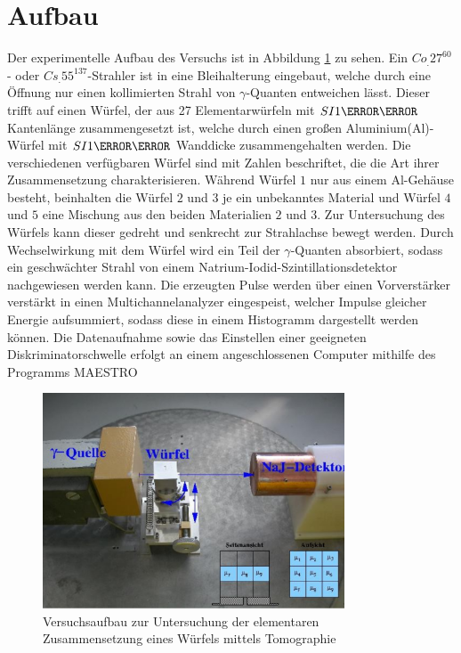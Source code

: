 \section{Aufbau}
\label{sec:Aufbau}

Der experimentelle Aufbau des Versuchs ist in Abbildung \ref{fig:aufbau} zu sehen.
Ein $Co_.{27}^\text{60}$- oder $Cs_.{55}^\text{137}$-Strahler ist in eine Bleihalterung eingebaut, welche durch eine Öffnung nur einen kollimierten Strahl von $\gamma$-Quanten entweichen lässt. Dieser trifft auf einen Würfel, der aus 27 Elementarwürfeln mit $SI{1}{\centi\meter}$ Kantenlänge zusammengesetzt ist, welche durch einen großen Aluminium(Al)-Würfel mit $SI{1}{\milli\meter}$ Wanddicke zusammengehalten werden.
Die verschiedenen verfügbaren Würfel sind mit Zahlen beschriftet, die die Art ihrer Zusammensetzung charakterisieren. Während Würfel $1$ nur aus einem Al-Gehäuse besteht, beinhalten die Würfel $2$ und $3$ je ein unbekanntes Material und Würfel $4$ und $5$ eine Mischung aus den beiden Materialien $2$ und $3$.
Zur Untersuchung des Würfels kann dieser gedreht und senkrecht zur Strahlachse bewegt werden.
Durch Wechselwirkung mit dem Würfel wird ein Teil der $\gamma$-Quanten absorbiert, sodass ein geschwächter Strahl von einem Natrium-Iodid-Szintillationsdetektor nachgewiesen werden kann. Die erzeugten Pulse werden über einen Vorverstärker verstärkt in einen Multichannelanalyzer eingespeist, welcher Impulse gleicher Energie aufsummiert, sodass diese in einem Histogramm dargestellt werden können.
Die Datenaufnahme sowie das Einstellen einer geeigneten Diskriminatorschwelle erfolgt an einem angeschlossenen Computer mithilfe des Programms MAESTRO
\begin{figure}
\centering
\includegraphics[keepaspectratio,width=0.8\textwidth]{content/images/aufbau.png}
\caption{Versuchsaufbau zur Untersuchung der elementaren Zusammensetzung eines Würfels mittels Tomographie\cite{V14}}
\label{fig:aufbau}
\end{figure}